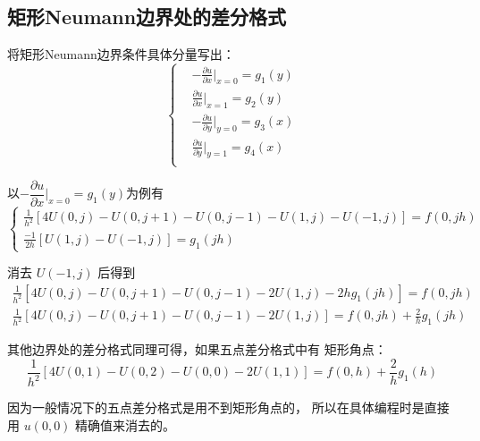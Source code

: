 \documentclass[a4paper]{article}
\begin{document}
\subsection{矩形Neumann边界处的差分格式}
\par 将矩形Neumann边界条件具体分量写出： 
\begin{equation}
    \left\{
        \begin{aligned}
            &-\frac{\partial u}{\partial x}\bigg|_{x=0} = g_1(y)\\
            &\frac{\partial u}{\partial x}\bigg|_{x=1} = g_2(y)\\
            &-\frac{\partial u}{\partial y}\bigg|_{y=0} = g_3(x)\\
            &\frac{\partial u}{\partial y}\bigg|_{y=1} = g_4(x)\\
        \end{aligned}
    \right.
\end{equation}
\par 以$-\dfrac{\partial u}{\partial x}\bigg|_{x=0} = g_1(y)$为例有
\begin{equation}
    \left\{
        \begin{gathered}
            \frac{1}{h^2}\left[
                4U(0, j) - U(0, j+1) - U(0, j-1) - U(1, j) - U(-1, j)
            \right]=f(0,jh)\\
            \frac{-1}{2h}\left[
                U(1, j) - U(-1, j)
            \right] = g_1(jh)
        \end{gathered}
    \right.
\end{equation}
\par 消去 $U(-1, j)$ 后得到
\begin{equation}
    \begin{gathered}
        \frac{1}{h^2}\left[
            4U(0, j) - U(0, j+1) - U(0, j-1) - 2U(1, j) - 2hg_1(jh)
        \right]=f(0,jh)\\
        \frac{1}{h^2}\left[
            4U(0, j) - U(0, j+1) - U(0, j-1) - 2U(1, j)
        \right]=f(0,jh)+\frac{2}{h}g_1(jh)
    \end{gathered}
\end{equation}
\par 其他边界处的差分格式同理可得，如果五点差分格式中有
矩形角点：
\begin{equation}
    \frac{1}{h^2}\left[
        4U(0, 1) - U(0, 2) - U(0, 0) - 2U(1, 1)
    \right]=f(0,h)+\frac{2}{h}g_1(h)
\end{equation}
\par 因为一般情况下的五点差分格式是用不到矩形角点的，
所以在具体编程时是直接用 $u(0,0)$ 精确值来消去的。
\end{document}
